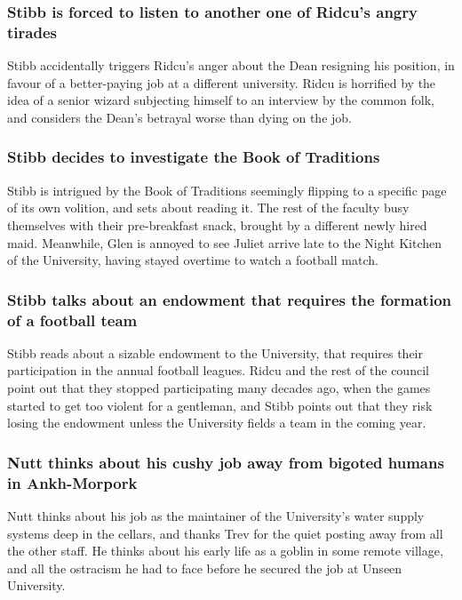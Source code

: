 \subsubsection{\Gls{Stibb} is forced to listen to another one of \Gls{Ridcu}'s angry tirades}
\Gls{Stibb} accidentally triggers \Gls{Ridcu}'s anger about the \Gls{Dean} resigning his position,
in favour of a better-paying job at a different university. \Gls{Ridcu} is horrified by the idea of
a senior wizard subjecting himself to an interview by the common folk, and considers the
\Gls{Dean}'s betrayal worse than dying on the job.

\subsubsection{\Gls{Stibb} decides to investigate the Book of Traditions}
\Gls{Stibb} is intrigued by the Book of Traditions seemingly flipping to a specific page of its
own volition, and sets about reading it. The rest of the faculty busy themselves with their
pre-breakfast snack, brought by a different newly hired maid. Meanwhile, \Gls{Glen} is annoyed to
see \Gls{Juliet} arrive late to the Night Kitchen of the University, having stayed overtime to
watch a football match.

\subsubsection{\Gls{Stibb} talks about an endowment that requires the formation of a football team}
\Gls{Stibb} reads about a sizable endowment to the University, that requires their participation in
the annual football leagues. \Gls{Ridcu} and the rest of the council point out that they stopped
participating many decades ago, when the games started to get too violent for a gentleman, and
\Gls{Stibb} points out that they risk losing the endowment unless the University fields a team in
the coming year.

\subsubsection{\Gls{Nutt} thinks about his cushy job away from bigoted humans in Ankh-Morpork}
\Gls{Nutt} thinks about his job as the maintainer of the University's water supply systems deep
in the cellars, and thanks \Gls{Trev} for the quiet posting away from all the other staff. He
thinks about his early life as a goblin in some remote village, and all the ostracism he had to
face before he secured the job at Unseen University.

